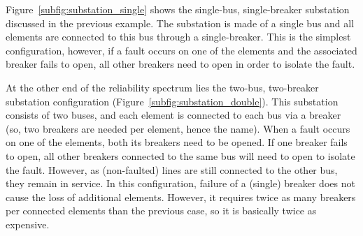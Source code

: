 Figure~\ref{subfig:substation_single} shows the single-bus, single-breaker substation discussed in the previous example. The substation is made of a single bus and all elements are connected to this bus through a single-breaker. This is the simplest configuration, however, if a fault occurs on one of the elements and the associated breaker fails to open, all other breakers need to open in order to isolate the fault.

At the other end of the reliability spectrum lies the two-bus, two-breaker substation configuration (Figure~\ref{subfig:substation_double}). This substation consists of two buses, and each element is connected to each bus via a breaker (so, two breakers are needed per element, hence the name). When a fault occurs on one of the elements, both its breakers need to be opened. If one breaker fails to open, all other breakers connected to the same bus will need to open to isolate the fault. However, as (non-faulted) lines are still connected to the other bus, they remain in service. In this configuration, failure of a (single) breaker does not cause the loss of additional elements. However, it requires twice as many breakers per connected elements than the previous case, so it is basically twice as expensive.

